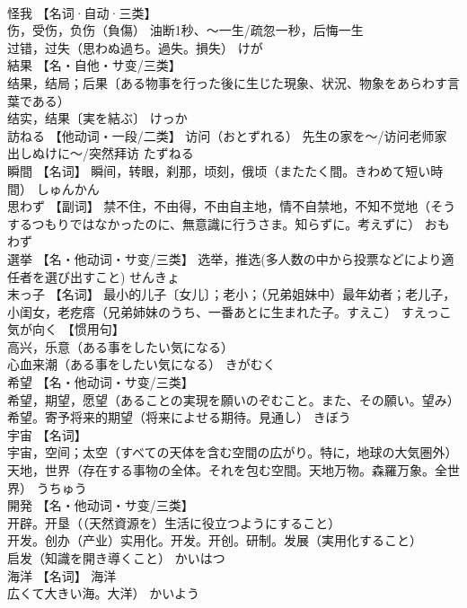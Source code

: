 \documentclass[8pt]{extreport}
\begin{document}
\begin{CJK}{UTF8}{min}
\\	怪我	【名词·自动·三类】 
\\	伤，受伤，负伤（負傷） 油断1秒、〜一生/疏忽一秒，后悔一生 
\\	过错，过失（思わぬ過ち。過失。損失）	けが	
\\	結果	【名・自他・サ变/三类】 
\\	结果，结局；后果〔ある物事を行った後に生じた現象、状況、物象をあらわす言葉である） 
\\	结实，结果〔実を結ぶ〕	けっか	
\\	訪ねる	【他动词・一段/二类】 访问（おとずれる） 先生の家を～/访问老师家 出しぬけに～/突然拜访	たずねる	
\\	瞬間	【名词】 瞬间，转眼，刹那，顷刻，俄顷（またたく間。きわめて短い時間）	しゅんかん	
\\	思わず	【副词】 禁不住，不由得，不由自主地，情不自禁地，不知不觉地（そうするつもりではなかったのに、無意識に行うさま。知らずに。考えずに）	おもわず	
\\	選挙	【名・他动词・サ变/三类】 选举，推选(多人数の中から投票などにより適任者を選び出すこと)	せんきょ	
\\	末っ子	【名词】 最小的儿子〔女儿〕；老小；（兄弟姐妹中）最年幼者；老儿子，小闺女，老疙瘩（兄弟姉妹のうち、一番あとに生まれた子。すえこ）	すえっこ	
\\	気が向く	【惯用句】 
\\	高兴，乐意（ある事をしたい気になる） 
\\	心血来潮（ある事をしたい気になる）	きがむく	
\\	希望	【名・他动词・サ变/三类】 
\\	希望，期望，愿望（あることの実現を願いのぞむこと。また、その願い。望み） 
\\	希望。寄予将来的期望（将来によせる期待。見通し）	きぼう	
\\	宇宙	【名词】 
\\	宇宙，空间；太空（すべての天体を含む空間の広がり。特に，地球の大気圏外） 
\\	天地，世界（存在する事物の全体。それを包む空間。天地万物。森羅万象。全世界）	うちゅう	
\\	開発	【名・他动词・サ变/三类】 
\\	开辟。开垦（（天然資源を）生活に役立つようにすること） 
\\	开发。创办（产业）实用化。开发。开创。研制。发展（実用化すること） 
\\	启发（知識を開き導くこと）	かいはつ	
\\	海洋	【名词】 海洋
\\	広くて大きい海。大洋）	かいよう	

\end{CJK}
\end{document}
